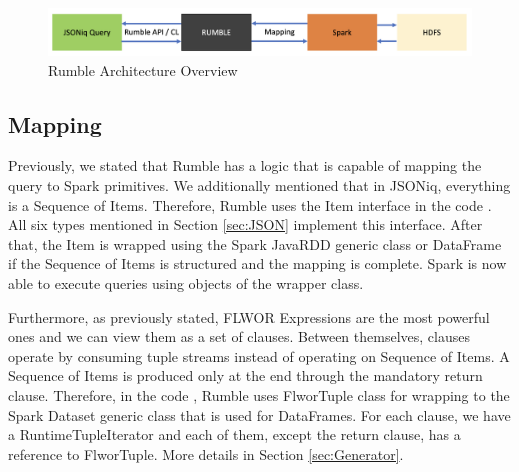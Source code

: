 \begin{figure}[h!]
	\includegraphics[width=\linewidth]{rumble_architecture.png}
	\caption{Rumble Architecture Overview}
	\label{fig:Rumble_Architecture}
\end{figure}

\subsection{Mapping}
\label{sec:RumbleMapping}
Previously, we stated that Rumble has a logic that is capable of mapping the query to Spark primitives. We additionally mentioned that in JSONiq, everything is a Sequence of Items. Therefore, Rumble uses the Item interface in the code \cite{RumbleRepository}. All six types mentioned in Section \ref{sec:JSON} implement this interface. After that, the Item is wrapped using the Spark JavaRDD generic class or DataFrame if the Sequence of Items is structured and the mapping is complete. Spark is now able to execute queries using objects of the wrapper class.

Furthermore, as previously stated, FLWOR Expressions are the most powerful ones and we can view them as a set of clauses. Between themselves, clauses operate by consuming tuple streams instead of operating on Sequence of Items. A Sequence of Items is produced only at the end through the mandatory return clause. Therefore, in the code \cite{RumbleRepository}, Rumble uses FlworTuple class for wrapping to the Spark Dataset generic class that is used for DataFrames. For each clause, we have a RuntimeTupleIterator and each of them, except the return clause, has a reference to FlworTuple. More details in Section \ref{sec:Generator}.

